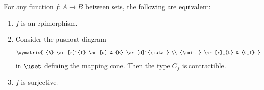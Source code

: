 %
\begin{lem}\label{epis-surj}
For any function $f:A\to B$ between sets, the following are equivalent:
\begin{enumerate}
\item $f$ is an epimorphism.
\item Consider the pushout diagram
\begin{equation*}
  \xymatrix{
    {A}
    \ar[r]^{f}
    \ar[d]
    &
    {B}
    \ar[d]^{\iota}
    \\
    {\unit}
    \ar[r]_{t}
    &
    {C_f}
  }
\end{equation*}
in $\uset$ defining the mapping cone. Then the type $C_f$ is contractible.
\item $f$ is surjective.
\end{enumerate}
\end{lem}

